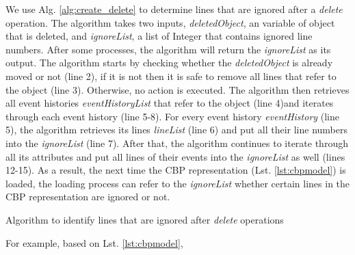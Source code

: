 \documentclass[sigconf]{acmart}
\begin{document}
We use Alg. \ref{alg:create_delete} to determine lines that are ignored after a \emph{delete} operation. The algorithm takes two inputs, \emph{deletedObject}, an variable of object that is deleted, and \emph{ignoreList}, a list of Integer that contains ignored line numbers. After some processes, the algorithm will return the \emph{ignoreList} as its output. The algorithm starts by checking whether the \emph{deletedObject} is already moved or not (line 2), if it is not then it is safe to remove all lines that refer to the object (line 3). Otherwise, no action is executed. The algorithm then retrieves all event histories \emph{eventHistoryList} that refer to the object (line 4)and iterates through each event history (line 5-8). For every event history \emph{eventHistory} (line 5), the algorithm retrieves its lines \emph{lineList} (line 6) and put all their line numbers into the \emph{ignoreList} (line 7). After that, the algorithm continues to iterate through all its attributes and put all lines of their events into the \emph{ignoreList} as well (lines 12-15). As a result, the next time the CBP representation (Lst. \ref{lst:cbpmodel}) is loaded, the loading process can refer to the \emph{ignoreList} whether certain lines in the CBP representation are ignored or not.       

\begin{algorithm}
\caption{Algorithm to identify lines that are ignored after \emph{delete} operations}
\label{alg:create_delete}
\end{algorithm}

For example, based on Lst. \ref{lst:cbpmodel}, 
\end{document}
